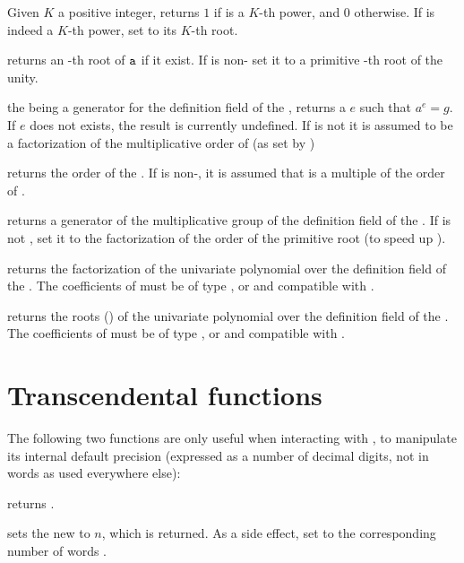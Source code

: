  Given $K$ a positive integer,
returns $1$ if  is a $K$-th power, and $0$ otherwise. If  is
indeed a $K$-th power, set  to its $K$-th root.

 returns an -th root of
${\tt a}$ if it exist. If  is non- set it to a primitive
-th root of the unity.

 the   being a
generator for the definition field of the  , returns a
 $e$ such that $a^e=g$.  If $e$ does not exists, the result is
currently undefined. If  is not  it is assumed to be a
factorization of the multiplicative order of  (as set by
)

 returns the order of the  .
If  is non-, it is assumed that  is a multiple of the
order of .

 returns a generator of the
multiplicative group of the definition field of the  .
If  is not , set it to the factorization of the order
of the primitive root (to speed up ).

 returns the factorization of the univariate
polynomial  over the definition field of the  . The
coefficients of  must be of type ,  or 
and compatible with .

 returns the roots ()
of the univariate polynomial  over the definition field of the
 . The coefficients of  must be of type ,
 or  and compatible with .

\section{Transcendental functions}

The following two functions are only useful when interacting with ,
to manipulate its internal default precision (expressed as a number of
decimal digits, not in words as used everywhere else):

 returns .

 sets the new
 to $n$, which is returned. As a side effect, set
 to the corresponding number of words .

